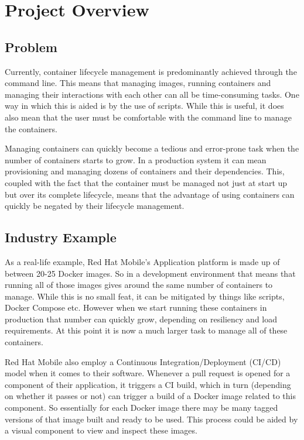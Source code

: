 \documentclass{article}
\begin{document}
\onehalfspacing
\tableofcontents
\newpage
\section{Project Overview}
\subsection{Problem}
\label{sub:problem}
Currently, container lifecycle management is predominantly achieved through the command line. This means that managing images, running containers and managing their interactions with each other can all be time-consuming tasks. One way in which this is aided is by the use of scripts. While this is useful, it does also mean that the user must be comfortable with the command line to manage the containers.

Managing containers can quickly become a tedious and error-prone task when the number of containers starts to grow. In a production system it can mean provisioning and managing dozens of containers and their dependencies. This, coupled with the fact that the container must be managed not just at start up but over its complete lifecycle, means that the advantage of using containers can quickly be negated by their lifecycle management.

\subsection{Industry Example}
\label{sub:industry}
As a real-life example, Red Hat Mobile's Application platform is made up of between 20-25 Docker images. So in a development environment that means that running all of those images gives around the same number of containers to manage. While this is no small feat, it can be mitigated by things like scripts, Docker Compose etc. However when we start running these containers in production that number can quickly grow, depending on resiliency and load requirements. At this point it is now a much larger task to manage all of these containers. 

Red Hat Mobile also employ a Continuous Integration/Deployment (CI/CD) model when it comes to their software. Whenever a pull request is opened for a component of their application, it triggers a CI build, which in turn (depending on whether it passes or not) can trigger a build of a Docker image related to this component. So essentially for each Docker image there may be many tagged versions of that image built and ready to be used. This process could be aided by a visual component to view and inspect these images.
\end{document}
